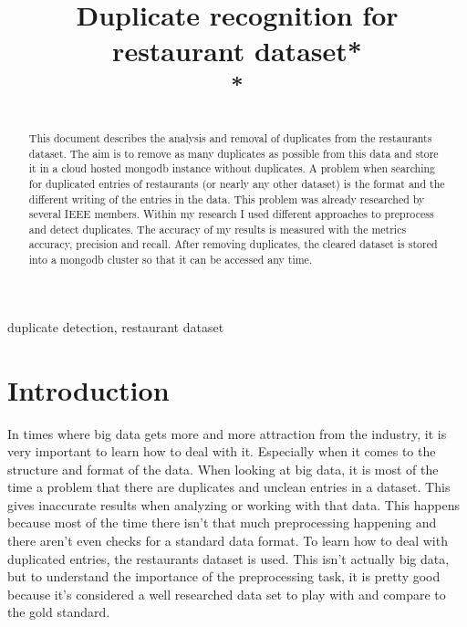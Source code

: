 \documentclass[conference]{IEEEtran}
\begin{document}
\title{Duplicate recognition for restaurant dataset*\\
	{\footnotesize \textsuperscript{*}}
}
\author{
}


\maketitle

\begin{abstract}
This document describes the analysis and removal of duplicates from the restaurants dataset\cite{bib:dataset}. The aim is to remove as many duplicates as possible from this data and store it in a cloud hosted mongodb instance without duplicates. A problem when searching for duplicated entries of restaurants (or nearly any other dataset) is the format and the different writing of the entries in the data. This problem was already researched by several IEEE members\cite{bib:foreign_research}. Within my research I used different approaches to preprocess and detect duplicates. The accuracy of my results is measured with the metrics accuracy, precision and recall. After removing duplicates, the cleared dataset is stored into a mongodb cluster so that it can be accessed any time.
\end{abstract}

\begin{IEEEkeywords}
duplicate detection, restaurant dataset
\end{IEEEkeywords}

\section{Introduction}
In times where big data gets more and more attraction from the industry, it is very important to learn how to deal with it. Especially when it comes to the structure and format of the data. When looking at big data, it is most of the time a problem that there are duplicates and unclean entries in a dataset. This gives inaccurate results when analyzing or working with that data. This happens because most of the time there isn't that much preprocessing happening and there aren't even checks for a standard data format. To learn how to deal with duplicated entries, the restaurants dataset is used. This isn't actually big data, but to understand the importance of the preprocessing task, it is pretty good because it's considered a well researched data set to play with and compare to the gold standard. 
\end{document}
